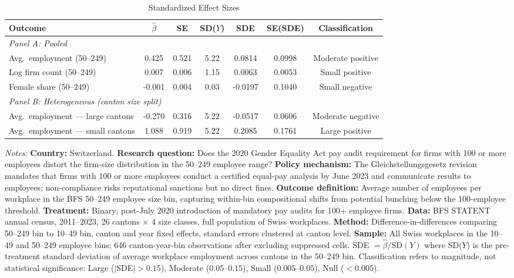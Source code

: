 \begin{table}[t]
\centering
\caption{Standardized Effect Sizes}
\label{tab:sde}
\begin{threeparttable}
\footnotesize
\begin{adjustbox}{max width=\textwidth}
\begin{tabular}{l cccccc}
\toprule
Outcome & $\hat{\beta}$ & SE & SD($Y$) & SDE & SE(SDE) & Classification \\
\midrule
\multicolumn{7}{l}{\textit{Panel A: Pooled}} \\
Avg.\ employment (50--249) & 0.425 & 0.521 & 5.22 & 0.0814 & 0.0998 & Moderate positive \\
Log firm count (50--249) & 0.007 & 0.006 & 1.15 & 0.0063 & 0.0053 & Small positive \\
Female share (50--249) & -0.001 & 0.004 & 0.03 & -0.0197 & 0.1040 & Small negative \\
\midrule
\multicolumn{7}{l}{\textit{Panel B: Heterogeneous (canton size split)}} \\
Avg.\ employment --- large cantons & -0.270 & 0.316 & 5.22 & -0.0517 & 0.0606 & Moderate negative \\
Avg.\ employment --- small cantons & 1.088 & 0.919 & 5.22 & 0.2085 & 0.1761 & Large positive \\
\bottomrule
\end{tabular}
\end{adjustbox}
\begin{tablenotes}[flushleft]\footnotesize
\item \textit{Notes:} \textbf{Country:} Switzerland. \textbf{Research question:} Does the 2020 Gender Equality Act pay audit requirement for firms with 100 or more employees distort the firm-size distribution in the 50--249 employee range? \textbf{Policy mechanism:} The Gleichstellungsgesetz revision mandates that firms with 100 or more employees conduct a certified equal-pay analysis by June 2023 and communicate results to employees; non-compliance risks reputational sanctions but no direct fines. \textbf{Outcome definition:} Average number of employees per workplace in the BFS 50--249 employee size bin, capturing within-bin compositional shifts from potential bunching below the 100-employee threshold. \textbf{Treatment:} Binary; post-July 2020 introduction of mandatory pay audits for 100+ employee firms. \textbf{Data:} BFS STATENT annual census, 2011--2023, 26 cantons $\times$ 4 size classes, full population of Swiss workplaces. \textbf{Method:} Difference-in-differences comparing 50--249 bin to 10--49 bin, canton and year fixed effects, standard errors clustered at canton level. \textbf{Sample:} All Swiss workplaces in the 10--49 and 50--249 employee bins; 646 canton-year-bin observations after excluding suppressed cells. SDE $= \hat{\beta} / \text{SD}(Y)$ where SD($Y$) is the pre-treatment standard deviation of average workplace employment across cantons in the 50--249 bin. Classification refers to magnitude, not statistical significance: Large ($|$SDE$| > 0.15$), Moderate ($0.05$--$0.15$), Small ($0.005$--$0.05$), Null ($< 0.005$).
\end{tablenotes}
\end{threeparttable}
\end{table}
